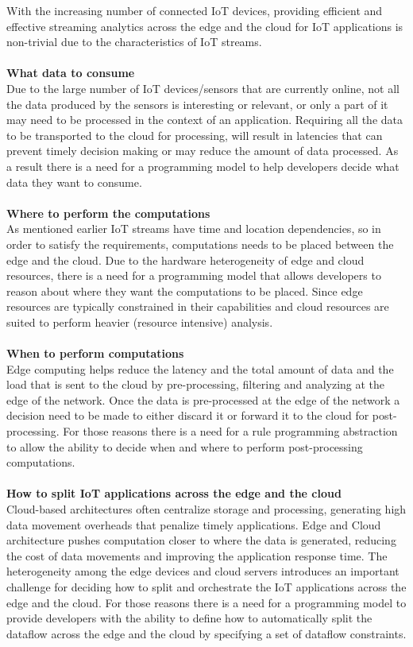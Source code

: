 With the increasing number of connected IoT devices, providing efficient and effective streaming analytics across the edge and the cloud for IoT applications is non-trivial due to the characteristics of IoT streams.
\\\\
\noindent\textbf{What data to consume}
\\
Due to the large number of IoT devices/sensors that are currently online, not all the data produced by the sensors is interesting or relevant, or only a part of it may need to be processed in the context of an application. Requiring all the data to be transported to the cloud for processing, will result in latencies that can prevent timely decision making or may reduce the amount of data processed. As a result there is a need for a programming model to help developers decide what data they want to consume.
\\\\
\noindent\textbf{Where to perform the computations}
\\
As mentioned earlier IoT streams have time and location dependencies, so in order to satisfy the requirements, computations needs to be placed between the edge and the cloud. Due to the hardware heterogeneity of edge and cloud resources, there is a need for a programming model that allows developers to reason about where they want the computations to be placed. Since edge resources are typically constrained in their capabilities and cloud resources are suited to perform heavier (resource intensive) analysis.
\\\\
\noindent\textbf{When to perform computations}
\\
Edge computing helps reduce the latency and the total amount of data and the load that is sent to the cloud by pre-processing, filtering and analyzing at the edge of the network. Once the data is pre-processed at the edge of the network a decision need to be made to either discard it or forward it to the cloud for post-processing. For those reasons there is a need for a rule programming abstraction to allow the ability to decide when and where to perform post-processing computations.
\\\\
\noindent\textbf{How to split IoT applications across the edge and the cloud}
\\
Cloud-based architectures often centralize storage and processing, generating high data
movement overheads that penalize timely applications. Edge and Cloud architecture pushes computation closer to where the data is generated, reducing the cost of data movements and improving the application response time. The heterogeneity among the edge devices and cloud servers introduces an important challenge for deciding how to split and orchestrate the IoT
applications across the edge and the cloud. For those reasons there is a need for a programming model to provide developers with the ability to define how to automatically split the dataflow across the edge and the cloud by specifying a set of dataflow constraints.

